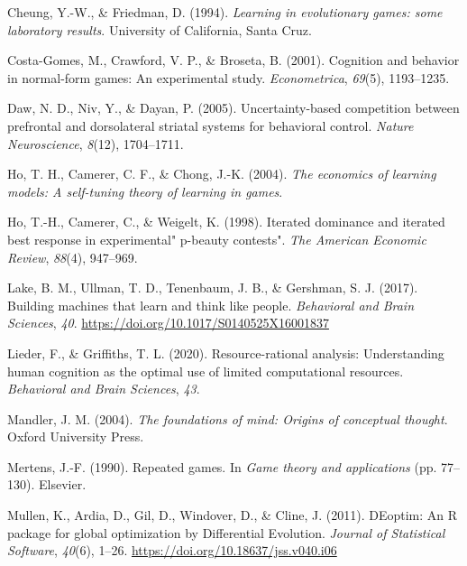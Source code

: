 \documentclass[man,floatsintext]{apa6}
\begin{document}
\leavevmode\hypertarget{ref-cheung1994learning}{}%
Cheung, Y.-W., \& Friedman, D. (1994). \emph{Learning in evolutionary games: some laboratory results}. University of California, Santa Cruz.

\leavevmode\hypertarget{ref-costa2001cognition}{}%
Costa-Gomes, M., Crawford, V. P., \& Broseta, B. (2001). Cognition and behavior in normal-form games: An experimental study. \emph{Econometrica}, \emph{69}(5), 1193--1235.

\leavevmode\hypertarget{ref-daw2005uncertainty}{}%
Daw, N. D., Niv, Y., \& Dayan, P. (2005). Uncertainty-based competition between prefrontal and dorsolateral striatal systems for behavioral control. \emph{Nature Neuroscience}, \emph{8}(12), 1704--1711.

\leavevmode\hypertarget{ref-ho2004economics}{}%
Ho, T. H., Camerer, C. F., \& Chong, J.-K. (2004). \emph{The economics of learning models: A self-tuning theory of learning in games}.

\leavevmode\hypertarget{ref-ho1998iterated}{}%
Ho, T.-H., Camerer, C., \& Weigelt, K. (1998). Iterated dominance and iterated best response in experimental" p-beauty contests". \emph{The American Economic Review}, \emph{88}(4), 947--969.

\leavevmode\hypertarget{ref-Lake2017}{}%
Lake, B. M., Ullman, T. D., Tenenbaum, J. B., \& Gershman, S. J. (2017). Building machines that learn and think like people. \emph{Behavioral and Brain Sciences}, \emph{40}. \url{https://doi.org/10.1017/S0140525X16001837}

\leavevmode\hypertarget{ref-lieder2020resource}{}%
Lieder, F., \& Griffiths, T. L. (2020). Resource-rational analysis: Understanding human cognition as the optimal use of limited computational resources. \emph{Behavioral and Brain Sciences}, \emph{43}.

\leavevmode\hypertarget{ref-mandler2004foundations}{}%
Mandler, J. M. (2004). \emph{The foundations of mind: Origins of conceptual thought}. Oxford University Press.

\leavevmode\hypertarget{ref-mertens1990repeated}{}%
Mertens, J.-F. (1990). Repeated games. In \emph{Game theory and applications} (pp. 77--130). Elsevier.

\leavevmode\hypertarget{ref-R-DEoptim}{}%
Mullen, K., Ardia, D., Gil, D., Windover, D., \& Cline, J. (2011). DEoptim: An R package for global optimization by Differential Evolution. \emph{Journal of Statistical Software}, \emph{40}(6), 1--26. \url{https://doi.org/10.18637/jss.v040.i06}
\end{document}
